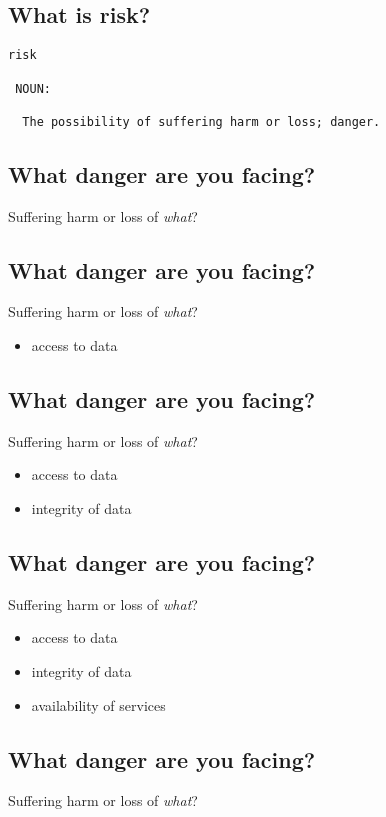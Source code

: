 \documentclass[xga]{xdvislides}
\begin{document}
\subsection{What is risk?}
\Huge
\begin{verbatim}
risk

 NOUN:

  The possibility of suffering harm or loss; danger.
\end{verbatim}
\Normalsize

\subsection{What danger are you facing?}
Suffering harm or loss of {\em what}?

\subsection{What danger are you facing?}
Suffering harm or loss of {\em what}?

\begin{itemize}
	\item access to data
\end{itemize}

\subsection{What danger are you facing?}
Suffering harm or loss of {\em what}?

\begin{itemize}
	\item access to data
	\item integrity of data
\end{itemize}

\subsection{What danger are you facing?}
Suffering harm or loss of {\em what}?

\begin{itemize}
	\item access to data
	\item integrity of data
	\item availability of services
\end{itemize}

\subsection{What danger are you facing?}
Suffering harm or loss of {\em what}?
\end{document}
